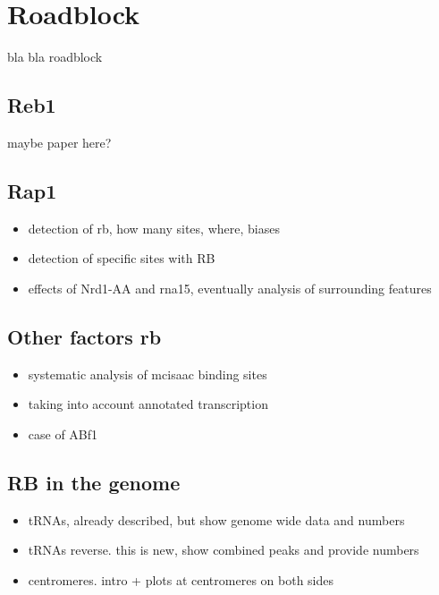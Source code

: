 \chapter{Roadblock}
bla bla roadblock

\section{Reb1}
maybe paper here? 

\section{Rap1}

\begin{itemize}
\item detection of rb, how many sites, where, biases
\item detection of specific sites with RB
\item effects of Nrd1-AA and rna15, eventually analysis of surrounding features
\end{itemize}

\section{Other factors rb}

\begin{itemize}
\item systematic analysis of mcisaac binding sites
\item taking into account annotated transcription
\item case of ABf1

\end{itemize}

\section{RB in the genome}

\begin{itemize}
\item tRNAs, already described, but show genome wide data and numbers
\item tRNAs reverse. this is new, show combined peaks and provide numbers
\item centromeres. intro + plots at centromeres on both sides
\end{itemize}



